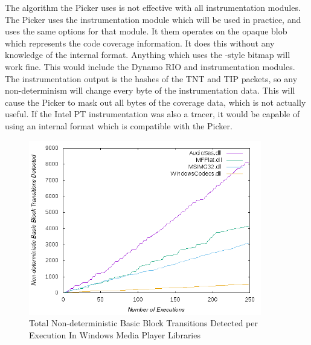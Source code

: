 The algorithm the Picker uses is not effective with all instrumentation
modules. The Picker uses the instrumentation module which will be used in
practice, and uses the same options for that module. It them operates on
the opaque blob which represents the code coverage information.  It does
this without any knowledge of the internal format.  Anything which uses the
\AFL{}-style bitmap will work fine.  This would include the Dynamo RIO and
\AFL{} instrumentation modules. The \IPT{} instrumentation output is the hashes
of the TNT and TIP packets, so any non-determinism will change every byte of
the instrumentation data.  This will cause the Picker to mask out all bytes of
the coverage data, which is not actually useful. If the Intel PT
instrumentation was also a tracer, it would be capable of using an internal
format which is compatible with the Picker.

\begin{figure}[htb]
\centering
\includegraphics[width=4in]{picker.png}
\caption{Total Non-deterministic Basic Block Transitions Detected per Execution In Windows Media Player Libraries}
\label{fig:picker}
\end{figure}
